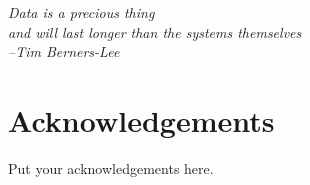 \phantom{~}

\vfill

\begin{flushright}
    {\em
        Data is a precious thing\\[0.25\baselineskip]
        and will last longer than the systems themselves\\[1.5\baselineskip]
        --Tim Berners-Lee
    }
\end{flushright}

\bigskip

\begingroup

\let\clearpage\relax
\let\cleardoublepage\relax
\let\cleardoublepage\relax

\section*{Acknowledgements}

\noindent Put your acknowledgements here.

\endgroup

\vfill